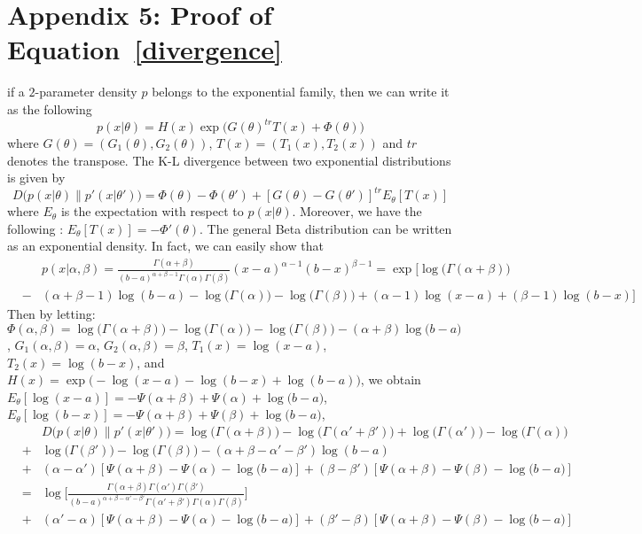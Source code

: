 \documentclass[journal,10pt]{elsart}
\begin{document}
\section*{Appendix 5: Proof of Equation~\ref{divergence}}\label{appendix6}
if a $2$-parameter density $p$ belongs to the exponential family,
then we can write it as the following \cite{Brown1986}
\begin{equation}\label{expogeneral}
p(x|\theta)=H(x)\exp\big(G(\theta)^{tr}T(x)+\Phi(\theta)\big)
\end{equation}
where $G(\theta)=(G_1(\theta),G_{2}(\theta))$, $T(x)=(T_1(x),T_2(x))$ and $tr$ denotes the transpose. The K-L divergence between two exponential
distributions is given by \cite{Brown1986}
 \begin{equation}\label{div}
 D\big(p(x|\theta)\|p'(x|\theta')\big)=\Phi(\theta)-\Phi(\theta')+[G(\theta)-G(\theta')]^{tr}E_{\theta}[T(x)]
 \end{equation}
where $E_{\theta}$ is the expectation with respect to $p(x|\theta)$.
Moreover, we have the following \cite{Brown1986}: $E_{\theta}[T(x)]=-\Phi'(\theta)$.
The general Beta distribution can be
written as an exponential density. In fact, we can easily show that
\begin{eqnarray}\label{expo}
\nonumber &&p(x|\alpha,\beta)=\frac{\Gamma(\alpha+\beta)}{(b-a)^{\alpha+\beta-1}\Gamma(\alpha)\Gamma(\beta)}(x-a)^{\alpha-1}(b-x)^{\beta-1}
=\exp\bigg[\log \big(\Gamma(\alpha+\beta)\big)\\\nonumber&-&(\alpha+\beta-1)\log(b-a)-\log\big(\Gamma(\alpha)\big)-\log\big(\Gamma(\beta)\big)+
(\alpha-1)\log(x-a)+(\beta-1)\log(b-x)\bigg]
\end{eqnarray}
Then by letting:
$
\Phi(\alpha,\beta)=\log \big(\Gamma(\alpha+\beta)\big)-\log\big(\Gamma(\alpha)\big)-\log\big(\Gamma(\beta)\big)-(\alpha+\beta)\log\big(b-a)
$, $G_1(\alpha,\beta)=\alpha$, $G_{2}(\alpha,\beta)=\beta$, $T_1(x)=\log(x-a)$, $T_2(x)=\log(b-x)$, and
$H(x)=\exp\bigg(-\log(x-a)-\log(b-x)+\log(b-a)\bigg)$,
we obtain $E_{\theta}[\log(x-a)]=-\Psi(\alpha+\beta)+\Psi(\alpha)+\log\big(b-a)$,
$E_{\theta}[\log(b-x)]=-\Psi(\alpha+\beta)+\Psi(\beta)+\log\big(b-a)$,
 \begin{eqnarray}\label{divbeta}
\nonumber &&D\big(p(x|\theta)\|p'(x|\theta')\big)=\log \big(\Gamma(\alpha+\beta)\big)-\log \big(\Gamma(\alpha'+\beta')\big)+\log\big(\Gamma(\alpha')\big)-\log\big(\Gamma(\alpha)\big)
 \\\nonumber&+&\log\big(\Gamma(\beta')\big)-\log\big(\Gamma(\beta)\big)-(\alpha+\beta-\alpha'-\beta')\log(b-a)
 \\\nonumber&+&(\alpha-\alpha')[\Psi(\alpha+\beta)-\Psi(\alpha)-\log\big(b-a)]
  +(\beta-\beta')[\Psi(\alpha+\beta)-\Psi(\beta)-\log\big(b-a)]
  \\\nonumber&=&\log\bigg[\frac{\Gamma(\alpha+\beta)\Gamma(\alpha')\Gamma(\beta')}{(b-a)^{\alpha+\beta-\alpha'-\beta'}\Gamma(\alpha'+\beta')\Gamma(\alpha)\Gamma(\beta)}\bigg]
   \\\nonumber&+&(\alpha'-\alpha)[\Psi(\alpha+\beta)-\Psi(\alpha)-\log\big(b-a)]
  +(\beta'-\beta)[\Psi(\alpha+\beta)-\Psi(\beta)-\log\big(b-a)]
 \end{eqnarray}
\end{document}
